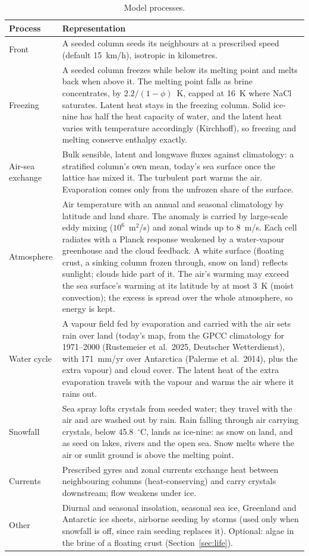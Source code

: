 \documentclass[11pt,a4paper]{article}
\newcommand{\degC}{$^{\circ}$C}
\begin{document}
\begin{table}[htbp]
\centering\small
\caption{Model processes.}
\label{tab:model}
\begin{tabular}{p{3.0cm}p{11.8cm}}
\toprule
Process & Representation \\
\midrule
Front & A seeded column seeds its neighbours at a prescribed speed (default 15~km/h), isotropic in kilometres. \\
Freezing & A seeded column freezes while below its melting point and melts back when above it. The melting point falls as brine concentrates, by $2.2/(1-\phi)$~K, capped at 16~K where NaCl saturates. Latent heat stays in the freezing column. Solid ice-nine has half the heat capacity of water, and the latent heat varies with temperature accordingly (Kirchhoff), so freezing and melting conserve enthalpy exactly. \\
Air-sea exchange & Bulk sensible, latent and longwave fluxes against climatology: a stratified column's own mean, today's sea surface once the lattice has mixed it. The turbulent part warms the air. Evaporation comes only from the unfrozen share of the surface. \\
Atmosphere & Air temperature with an annual and seasonal climatology by latitude and land share. The anomaly is carried by large-scale eddy mixing ($10^6$~m$^2$/s) and zonal winds up to 8~m/s. Each cell radiates with a Planck response weakened by a water-vapour greenhouse and the cloud feedback. A white surface (floating crust, a sinking column frozen through, snow on land) reflects sunlight; clouds hide part of it. The air's warming may exceed the sea surface's warming at its latitude by at most 3~K (moist convection); the excess is spread over the whole atmosphere, so energy is kept. \\
Water cycle & A vapour field fed by evaporation and carried with the air sets rain over land (today's map, from the GPCC climatology for 1971--2000 (Rustemeier et al.\ 2025, Deutscher Wetterdienst), with 171~mm/yr over Antarctica (Palerme et al.\ 2014), plus the extra vapour) and cloud cover. The latent heat of the extra evaporation travels with the vapour and warms the air where it rains out. \\
Snowfall & Sea spray lofts crystals from seeded water; they travel with the air and are washed out by rain. Rain falling through air carrying crystals, below 45.8~\degC, lands as ice-nine: as snow on land, and as seed on lakes, rivers and the open sea. Snow melts where the air or sunlit ground is above the melting point. \\
Currents & Prescribed gyres and zonal currents exchange heat between neighbouring columns (heat-conserving) and carry crystals downstream; flow weakens under ice. \\
Other & Diurnal and seasonal insolation, seasonal sea ice, Greenland and Antarctic ice sheets, airborne seeding by storms (used only when snowfall is off, since rain seeding replaces it). Optional: algae in the brine of a floating crust (Section~\ref{sec:life}). \\
\bottomrule
\end{tabular}
\end{table}
\end{document}
